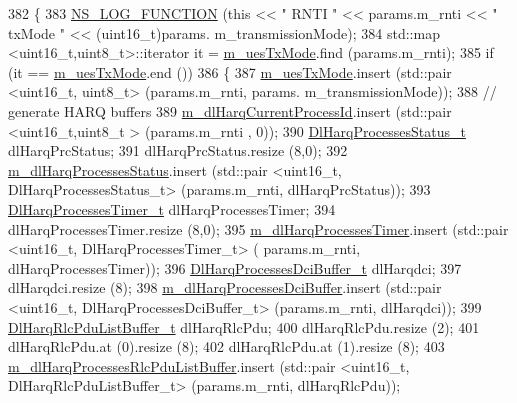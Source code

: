 \begin{DoxyCode}
382 \{
383   \hyperlink{log-macros-disabled_8h_a90b90d5bad1f39cb1b64923ea94c0761}{NS\_LOG\_FUNCTION} (\textcolor{keyword}{this} << \textcolor{stringliteral}{" RNTI "} << params.m\_rnti << \textcolor{stringliteral}{" txMode "} << (uint16\_t)params.
      m\_transmissionMode);
384   std::map <uint16\_t,uint8\_t>::iterator it = \hyperlink{classns3_1_1CqaFfMacScheduler_ac556c4275bc3c2c078fd5856069ba0ca}{m\_uesTxMode}.find (params.m\_rnti);
385   \textcolor{keywordflow}{if} (it == \hyperlink{classns3_1_1CqaFfMacScheduler_ac556c4275bc3c2c078fd5856069ba0ca}{m\_uesTxMode}.end ())
386     \{
387       \hyperlink{classns3_1_1CqaFfMacScheduler_ac556c4275bc3c2c078fd5856069ba0ca}{m\_uesTxMode}.insert (std::pair <uint16\_t, uint8\_t> (params.m\_rnti, params.
      m\_transmissionMode));
388       \textcolor{comment}{// generate HARQ buffers}
389       \hyperlink{classns3_1_1CqaFfMacScheduler_a1fc0136a3398fb51805a2a91e40d820e}{m\_dlHarqCurrentProcessId}.insert (std::pair <uint16\_t,uint8\_t > (params.m\_rnti
      , 0));
390       \hyperlink{namespacens3_a457b3571b67ff17d042e9894e90e2ce2}{DlHarqProcessesStatus\_t} dlHarqPrcStatus;
391       dlHarqPrcStatus.resize (8,0);
392       \hyperlink{classns3_1_1CqaFfMacScheduler_ad68bd0730def22b00204de5f3a8fb109}{m\_dlHarqProcessesStatus}.insert (std::pair <uint16\_t, DlHarqProcessesStatus\_t> 
      (params.m\_rnti, dlHarqPrcStatus));
393       \hyperlink{namespacens3_a39413ade536de4b1c82d6c0074cc703e}{DlHarqProcessesTimer\_t} dlHarqProcessesTimer;
394       dlHarqProcessesTimer.resize (8,0);
395       \hyperlink{classns3_1_1CqaFfMacScheduler_a2e130ab374b4770c3544495ba593f023}{m\_dlHarqProcessesTimer}.insert (std::pair <uint16\_t, DlHarqProcessesTimer\_t> (
      params.m\_rnti, dlHarqProcessesTimer));
396       \hyperlink{namespacens3_af25599bf8f9f564075c005759c9af18c}{DlHarqProcessesDciBuffer\_t} dlHarqdci;
397       dlHarqdci.resize (8);
398       \hyperlink{classns3_1_1CqaFfMacScheduler_a4de0e4833545b31fcb31f77492a34380}{m\_dlHarqProcessesDciBuffer}.insert (std::pair <uint16\_t,
       DlHarqProcessesDciBuffer\_t> (params.m\_rnti, dlHarqdci));
399       \hyperlink{namespacens3_a4c0cbd1e72f1c667f8b5879655f13210}{DlHarqRlcPduListBuffer\_t} dlHarqRlcPdu;
400       dlHarqRlcPdu.resize (2);
401       dlHarqRlcPdu.at (0).resize (8);
402       dlHarqRlcPdu.at (1).resize (8);
403       \hyperlink{classns3_1_1CqaFfMacScheduler_a019cbb20e91d699a8c7e26fb8d69ff4e}{m\_dlHarqProcessesRlcPduListBuffer}.insert (std::pair <uint16\_t,
       DlHarqRlcPduListBuffer\_t> (params.m\_rnti, dlHarqRlcPdu));

\end{DoxyCode}

